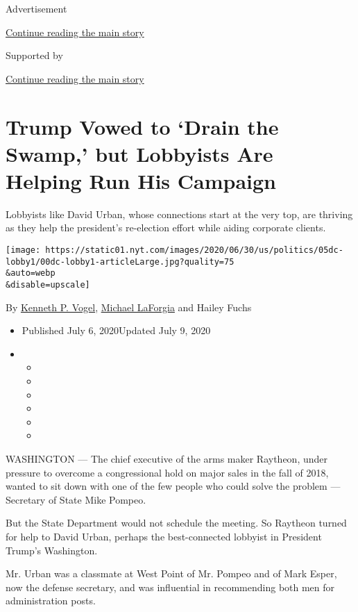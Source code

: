 Advertisement

\protect\hyperlink{after-top}{Continue reading the main story}

Supported by

\protect\hyperlink{after-sponsor}{Continue reading the main story}

\hypertarget{trump-vowed-to-drain-the-swamp-but-lobbyists-are-helping-run-his-campaign}{%
\section{Trump Vowed to `Drain the Swamp,' but Lobbyists Are Helping Run
His
Campaign}\label{trump-vowed-to-drain-the-swamp-but-lobbyists-are-helping-run-his-campaign}}

Lobbyists like David Urban, whose connections start at the very top, are
thriving as they help the president's re-election effort while aiding
corporate clients.

\texttt{[image: https://static01.nyt.com/images/2020/06/30/us/politics/05dc-lobby1/00dc-lobby1-articleLarge.jpg?quality=75\\\&auto=webp\\\&disable=upscale]}

By \href{https://www.nytimes.com/by/kenneth-p-vogel}{Kenneth P. Vogel},
\href{https://www.nytimes.com/by/michael-laforgia}{Michael LaForgia} and
Hailey Fuchs

\begin{itemize}
\item
  Published July 6, 2020Updated July 9, 2020
\item
  \begin{itemize}
  \item
  \item
  \item
  \item
  \item
  \item
  \end{itemize}
\end{itemize}

WASHINGTON --- The chief executive of the arms maker Raytheon, under
pressure to overcome a congressional hold on major sales in the fall of
2018, wanted to sit down with one of the few people who could solve the
problem --- Secretary of State Mike Pompeo.

But the State Department would not schedule the meeting. So Raytheon
turned for help to David Urban, perhaps the best-connected lobbyist in
President Trump's Washington.

Mr. Urban was a classmate at West Point of Mr. Pompeo and of Mark Esper,
now the defense secretary, and was influential in recommending both men
for administration posts.

